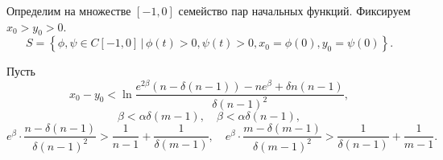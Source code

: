 Определим на множестве $[-1, 0]$ семейство пар начальных функций. Фиксируем $x_0 > y_0 > 0$.
\small
\begin{equation}
	\label{eq:initial_set}
	S = \left\{\phi, \psi \in C[-1, 0] \,|\, \phi(t) > 0, \psi(t) > 0, x_0 = \phi(0), y_0 = \psi(0)\right\}.
\end{equation}
\normalsize

\begin{theorem}
	\label{thm:relay_solution}
	Пусть 
	\begin{equation}
		\label{eq:constraint_1}
		x_0 - y_0 < \ln \dfrac{e^{2\beta}(n - \delta(n - 1)) - ne^{\beta} + \delta n(n - 1)}{\delta (n - 1)^2},
	\end{equation}
	\begin{equation}
		\label{eq:constraint_2}
		\beta < \alpha \delta (m - 1), \quad \beta < \alpha \delta (n - 1),
	\end{equation}
	\small
	\begin{equation}
		\label{eq:constraint_3}
		e^{\beta} \cdot \dfrac{n - \delta(n - 1)}{\delta (n - 1)^2} > \dfrac{1}{n - 1} + \dfrac{1}{\delta(m - 1)}, \quad
		e^{\beta} \cdot \dfrac{m - \delta(m - 1)}{\delta (m - 1)^2} > \dfrac{1}{\delta(n - 1)} + \dfrac{1}{m - 1}.
	\end{equation}
	\normalsize
	

\end{theorem}

